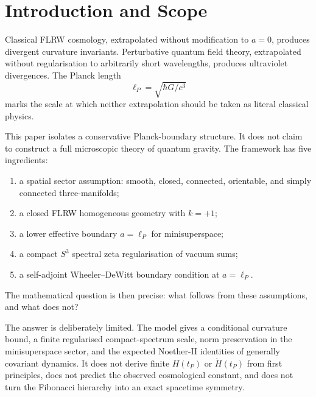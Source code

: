 \documentclass[reprint,aps,prd,letterpaper,superscriptaddress,nofootinbib,longbibliography,floatfix]{revtex4-2}
\theoremstyle{remark}
\begin{document}

\maketitle

\section{Introduction and Scope}

Classical FLRW cosmology, extrapolated without modification to \(a=0\), produces
divergent curvature invariants.  Perturbative quantum field theory, extrapolated
without regularisation to arbitrarily short wavelengths, produces ultraviolet
divergences.  The Planck length
\[
  \ell_P=\sqrt{\hbar G/c^3}
\]
marks the scale at which neither extrapolation should be taken as literal
classical physics.

This paper isolates a conservative Planck-boundary structure.  It does not claim
to construct a full microscopic theory of quantum gravity.  The framework has
five ingredients:
\begin{enumerate}
\item a spatial sector assumption: smooth, closed, connected, orientable, and
  simply connected three-manifolds;
\item a closed FLRW homogeneous geometry with \(k=+1\);
\item a lower effective boundary \(a=\ell_P\) for minisuperspace;
\item a compact \(S^3\) spectral zeta regularisation of vacuum sums;
\item a self-adjoint Wheeler--DeWitt boundary condition at \(a=\ell_P\).
\end{enumerate}
The mathematical question is then precise: what follows from these assumptions,
and what does not?

The answer is deliberately limited.  The model gives a conditional curvature
bound, a finite regularised compact-spectrum scale, norm preservation in the
minisuperspace sector, and the expected Noether-II identities of generally
covariant dynamics.  It does not derive finite \(H(t_P)\) or \(\dot H(t_P)\)
from first principles, does not predict the observed cosmological constant, and
does not turn the Fibonacci hierarchy into an exact spacetime symmetry.
\end{document}
